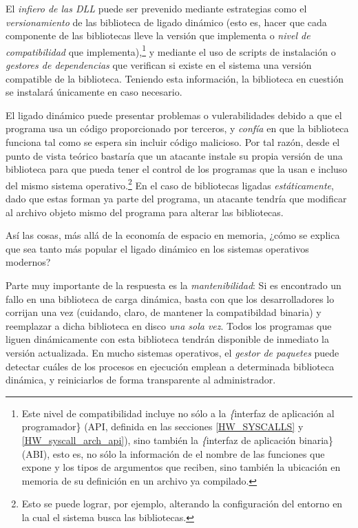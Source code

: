 \documentclass[11pt,fleqn]{book} %
\begin{document}
El \emph{infiero de las DLL} puede ser prevenido mediante estrategias como
el \emph{versionamiento} de las biblioteca de ligado dinámico (esto es,
hacer que cada componente de las bibliotecas lleve la versión que
implementa o \emph{nivel de compatibilidad} que implementa),\footnote{Este
nivel de compatibilidad incluye no sólo a la \emph\{interfaz de aplicación
al programador\} (API, definida en las secciones \ref{HW_SYSCALLS} y
\ref{HW_syscall_arch_api}), sino también la \emph\{interfaz de aplicación
binaria\} (ABI), esto es, no sólo la información de el nombre de las
funciones que expone y los tipos de argumentos que reciben, sino
también la ubicación en memoria de su definición en un archivo ya
compilado. } y mediante el uso de scripts de instalación o \emph{gestores de dependencias} que verifican si existe en el sistema una versión
compatible de la biblioteca. Teniendo esta información, la biblioteca
en cuestión se instalará únicamente en caso necesario.

El ligado dinámico puede presentar problemas o vulerabilidades debido
a que el programa usa un código proporcionado por terceros, y \emph{confía}
en que la biblioteca funciona tal como se espera sin incluir código
malicioso. Por tal razón, desde el punto de vista teórico bastaría que
un atacante instale su propia versión de una biblioteca para que pueda
tener el control de los programas que la usan e incluso del mismo
sistema operativo.\footnote{Esto se puede lograr, por ejemplo, alterando
la configuración del entorno en la cual el sistema busca las
bibliotecas. } En el caso de bibliotecas ligadas \emph{estáticamente}, dado
que estas forman ya parte del programa, un atacante tendría que
modificar al archivo objeto mismo del programa para alterar las
bibliotecas.

Así las cosas, más allá de la economía de espacio en memoria, ¿cómo se
explica que sea tanto más popular el ligado dinámico en los sistemas
operativos modernos?

Parte muy importante de la respuesta es la \emph{mantenibilidad}: Si es
encontrado un fallo en una biblioteca de carga dinámica, basta con que
los desarrolladores lo corrijan una vez (cuidando, claro, de mantener
la compatibildad binaria) y reemplazar a dicha biblioteca en disco
\emph{una sola vez}. Todos los programas que liguen dinámicamente con esta
biblioteca tendrán disponible de inmediato la versión actualizada. En
mucho sistemas operativos, el \emph{gestor de paquetes} puede detectar
cuáles de los procesos en ejecución emplean a determinada biblioteca
dinámica, y reiniciarlos de forma transparente al administrador.
\end{document}
